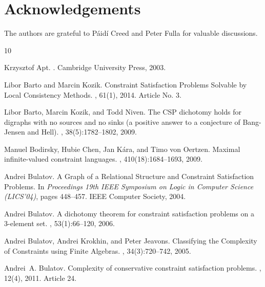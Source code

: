 \documentclass[11pt, reqno]{article}
\theoremstyle{remark}
\begin{document}
\section*{Acknowledgements}
The authors are grateful to P\'aid\'i Creed and Peter Fulla for valuable discussions.

%
%

\newcommand{\noopsort}[1]{}
\begin{thebibliography}{10}

Krzysztof Apt.
.
\newblock Cambridge University Press, 2003.

Libor Barto and Marcin Kozik.
\newblock Constraint {S}atisfaction {P}roblems {S}olvable by {L}ocal
  {C}onsistency {M}ethods.
, 61(1), 2014.
\newblock Article No. 3.

Libor Barto, Marcin Kozik, and Todd Niven.
\newblock The {C}{S}{P} dichotomy holds for digraphs with no sources and no
  sinks (a positive answer to a conjecture of {B}ang-{J}ensen and {H}ell).
, 38(5):1782--1802, 2009.

Manuel Bodirsky, Hubie Chen, Jan K{\'{a}}ra, and Timo von Oertzen.
\newblock Maximal infinite-valued constraint languages.
, 410(18):1684--1693, 2009.

Andrei Bulatov.
\newblock A {G}raph of a {R}elational {S}tructure and {C}onstraint
  {S}atisfaction {P}roblems.
\newblock In {\em Proceedings 19th {I{E}{E}{E}} {S}ymposium on {L}ogic in
  {C}omputer {S}cience (L{I}{C}{S}'04)}, pages 448--457. IEEE Computer Society,
  2004.

Andrei Bulatov.
\newblock A dichotomy theorem for constraint satisfaction problems on a
  3-element set.
, 53(1):66--120, 2006.

Andrei Bulatov, Andrei Krokhin, and Peter Jeavons.
\newblock Classifying the {C}omplexity of {C}onstraints using {F}inite
  {A}lgebras.
, 34(3):720--742, 2005.

Andrei~A. Bulatov.
\newblock Complexity of conservative constraint satisfaction problems.
, 12(4), 2011.
\newblock Article 24.


\end{thebibliography}
\end{document}
